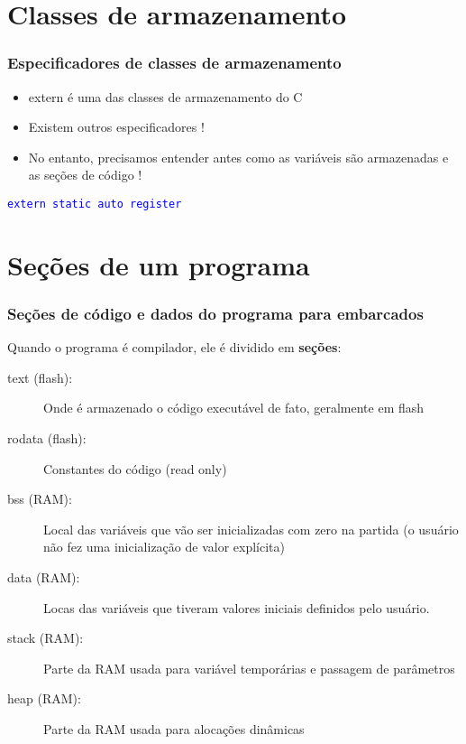 \documentclass{beamer}
\begin{document}
\section{Classes de armazenamento}

\begin{frame}
	\frametitle{Especificadores de classes de armazenamento}
	\begin{itemize}
	\item extern é uma das classes de armazenamento do C
	\item Existem outros especificadores !
	\item No entanto, precisamos entender antes como as variáveis são armazenadas e as seções de código !
	\end{itemize}
	\vspace*{0.5cm}
	\begin{center}
		\texttt{\textcolor{blue}{extern static auto register}}
	\end{center}
	
\end{frame}

\section{Seções de um programa}

\begin{frame}
	\frametitle{Seções de código e dados do programa para embarcados}
    Quando o programa é compilador, ele é dividido em \textbf{seções}:
    \vspace*{0.5cm}
    \begin{description}
    \item[text (flash):] Onde é armazenado o código executável de fato, geralmente em flash
    \item[rodata (flash):] Constantes do código (read only)
    \item[bss (RAM):] Local das variáveis que vão ser inicializadas com zero na partida (o usuário não fez uma inicialização de valor explícita)
    \item[data (RAM):] Locas das variáveis que tiveram valores iniciais definidos pelo usuário.
    \item[stack (RAM):] Parte da RAM usada para variável temporárias e passagem de parâmetros
    \item[heap (RAM):] Parte da RAM usada para alocações dinâmicas
    \end{description}
\end{frame}
\end{document}
